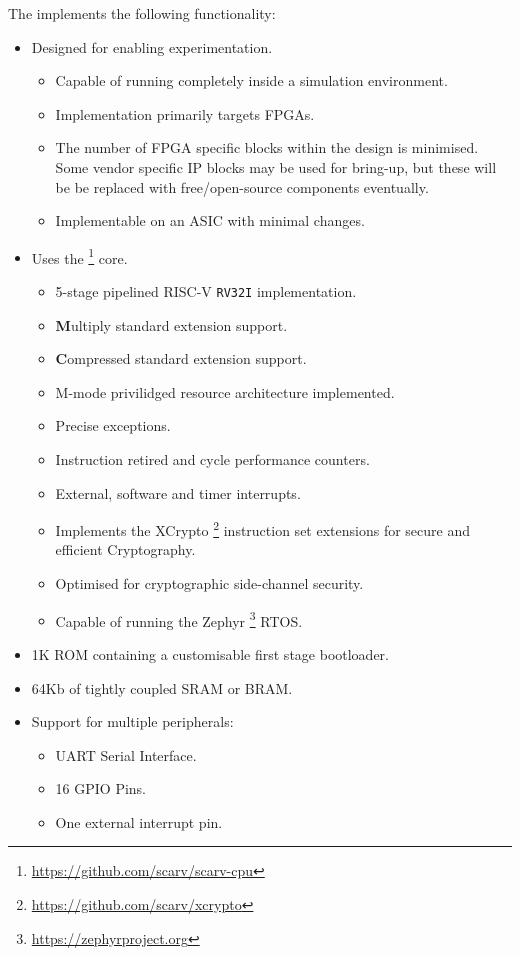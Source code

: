
The \SCARVSOC implements the following functionality:

\begin{itemize}

\item Designed for enabling experimentation.
    
    \begin{itemize}
    \item Capable of running completely inside a simulation environment.

    \item Implementation primarily targets FPGAs.

    \item The number of FPGA specific blocks within the design is
        minimised.  Some vendor specific IP blocks may be used for
        bring-up, but these will be be replaced with free/open-source
        components eventually.

    \item Implementable on an ASIC with minimal changes.
    \end{itemize}

\item Uses the \SCARVCPU \footnote{\url{https://github.com/scarv/scarv-cpu}}
      core.

    \begin{itemize}
    \item 5-stage pipelined RISC-V {\tt RV32I} implementation.
    \item {\bf M}ultiply standard extension support.
    \item {\bf C}ompressed standard extension support.
    \item M-mode privilidged resource architecture implemented.
    \item Precise exceptions.
    \item Instruction retired and cycle performance counters.
    \item External, software and timer interrupts.
    \item Implements the XCrypto
        \footnote{\url{https://github.com/scarv/xcrypto}}
        instruction set extensions for secure and efficient Cryptography.
    \item Optimised for cryptographic side-channel security.
    \item Capable of running the Zephyr
        \footnote{\url{https://zephyrproject.org}}
        RTOS.
    \end{itemize}

\item 1K ROM containing a customisable first stage bootloader.

\item 64Kb of tightly coupled SRAM or BRAM.

\item Support for multiple peripherals:

    \begin{itemize}
    \item UART Serial Interface.
    \item 16 GPIO Pins.
    \item One external interrupt pin.
    \end{itemize}

\end{itemize}

